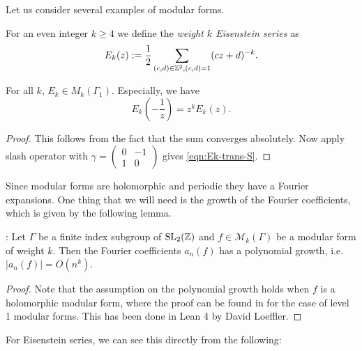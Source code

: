 Let us consider several examples of modular forms.
\begin{definition}\label{def:Ek} 
For an even integer $k\geq 4$ we define the \emph{weight $k$ Eisenstein series} as
\begin{equation}\label{eqn:Ek-definition}
E_k(z):=\frac{1}{2}\sum_{(c,d)\in\mathbb{Z}^2, (c,d)=1}(cz+d)^{-k}.\end{equation}
\end{definition}
\begin{lemma}\label{lemma:Ek-is-modular-form}
For all $k$, $E_k\in M_k(\Gamma_1)$.
Especially, we have
\begin{equation}\label{eqn:Ek-trans-S}
    E_k \left(-\frac{1}{z}\right) = z^k E_k(z).
\end{equation}
\end{lemma}
\begin{proof}
    \leanok
This follows from the fact that the sum converges absolutely.
Now apply slash operator with $\gamma = \left(\begin{smallmatrix} 0 & -1 \\ 1 & 0 \end{smallmatrix}\right)$ gives \eqref{eqn:Ek-trans-S}.
\end{proof}

Since modular forms are holomorphic and periodic they have a Fourier expansions. One thing that we
will need is the growth of the Fourier coefficients, which is given by the following lemma.

\begin{lemma}\label{lemma:mod_form_poly_growth}\leanok : Let $\Gamma$ be a finite index subgroup of $\mathrm{SL}_2(\mathbb{Z})$ and $f \in \mathcal{M}_k(\Gamma)$ be a modular form of weight $k$. Then the Fourier coefficients $a_n(f)$ has a polynomial growth, i.e. $|a_n(f)| = O(n^k)$.
\end{lemma}

\begin{proof}\leanok
Note that the assumption on the polynomial growth holds when $f$ is a holomorphic modular form, where the proof can be found in \cite[p. 94]{Serre73} for the case of level 1 modular forms. This has been done in Lean 4 by David Loeffler.
\end{proof}

For Eisenstein series, we can see this directly from the following:

